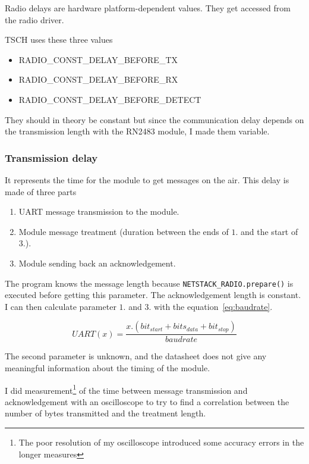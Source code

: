 Radio delays are hardware platform-dependent values. 
They get accessed from the radio driver.

TSCH uses these three values

\begin{itemize}
  \item RADIO\_CONST\_DELAY\_BEFORE\_TX
  \item RADIO\_CONST\_DELAY\_BEFORE\_RX
  \item RADIO\_CONST\_DELAY\_BEFORE\_DETECT
\end{itemize}

They should in theory be constant but since the communication delay depends
on the transmission length with the RN2483 module, I made them variable.


\subsubsection{Transmission delay}

It represents the time for the module to get messages on the air. 
This delay is made of three parts

\begin{enumerate}
  \item UART message transmission to the module.
  \item Module message treatment (duration between the ends of $1.$ and the start of $3.$).
  \item Module sending back an acknowledgement.
\end{enumerate}

The program knows the message length because
\lstinline{NETSTACK_RADIO.prepare()} is executed before getting this parameter.
The acknowledgement length is constant. 
I can then calculate parameter $1.$ and $3.$ with the equation~\ref{eq:baudrate}.

\begin{equation}
  \label{eq:baudrate}
  UART(x) = \frac{x . (bit_{start} + bits_{data} + bit_{stop})}{baudrate}
\end{equation}

The second parameter is unknown, and the datasheet does not give any meaningful
information about the timing of the module.

I did measurement\footnote{The poor resolution of my oscilloscope introduced
some accuracy errors in the longer measures} of the time between message
transmission and acknowledgement with an oscilloscope to try to find a
correlation between the number of bytes transmitted and the treatment length.

